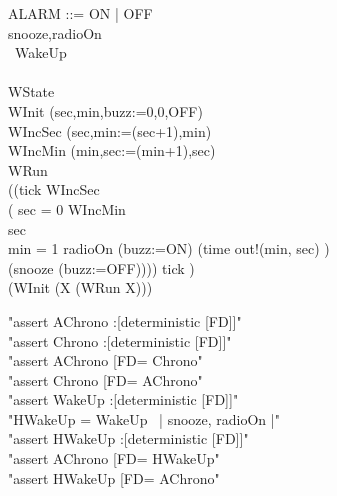 \begin{circus}
ALARM ::= ON | OFF\\
\circchannel snooze,radioOn\\

\circprocess\ WakeUp \circdef\\
\circbegin\\
\circstate WState \\
WInit \circdef (sec,min,buzz:=0,0,OFF)\\
WIncSec \circdef (sec,min:=(sec+1),min)\\
WIncMin \circdef (min,sec:=(min+1),sec)\\
WRun \circdef \\
((tick \then WIncSec \circseq \\
		( \lcircguard sec = 0 \rcircguard \circguard WIncMin\\
		\extchoice \lcircguard sec  \rcircguard \circguard \Skip\\
		\extchoice \lcircguard min = 1 \rcircguard \circguard radioOn \then (buzz:=ON)
		\extchoice (time \then out!(min, sec) \then \Skip)\\
		\extchoice (snooze \then (buzz:=OFF)))) \circhide \lchanset tick \rchanset)
\\
\circspot (WInit \circseq (\circmu X \circspot (WRun \circseq X)))\\
\circend
\end{circus}

\begin{assert}
"assert AChrono :[deterministic [FD]]"\\
\also"assert Chrono :[deterministic [FD]]"\\
\also"assert AChrono [FD= Chrono"\\
\also"assert Chrono [FD= AChrono"\\

\also"assert WakeUp :[deterministic [FD]]"\\

\also"HWakeUp = WakeUp \ {| snooze, radioOn |}"\\

\also"assert HWakeUp :[deterministic [FD]]"\\

\also"assert AChrono [FD= HWakeUp"\\
\also"assert HWakeUp [FD= AChrono"\\
\end{assert}
